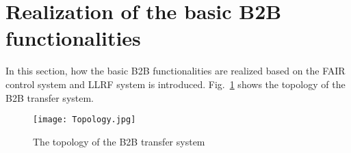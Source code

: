 \section{Realization of the basic B2B functionalities}
In this section, how the basic B2B functionalities are realized based on the FAIR control system and LLRF system is introduced.
Fig.~\ref{Topology} shows the topology of the B2B transfer system.
\begin{figure}[!htb]
   \centering   
   \texttt{[image: Topology.jpg]}
   \caption{The topology of the B2B transfer system}
   \label{Topology}
\end{figure}
